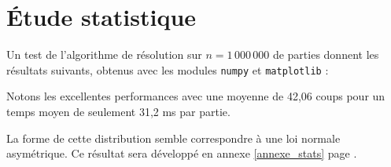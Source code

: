 \newpage

\section{Étude statistique}
Un test de l'algorithme de résolution sur $n=1\,000\,000$ de parties donnent les résultats suivants, obtenus avec les modules \texttt{numpy} et \texttt{matplotlib} :

\begin{center}
\end{center}

Notons les excellentes performances avec une moyenne de 42,06 coups pour un temps moyen de seulement 31,2 ms par partie.

La forme de cette distribution semble correspondre à une loi normale asymétrique. Ce résultat sera développé en annexe \ref{annexe_stats} page \pageref{annexe_stats}.